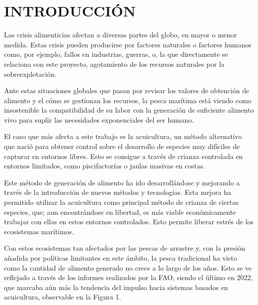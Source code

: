 \section{INTRODUCCIÓN}

Las crisis alimenticias afectan a diversas partes del globo, en mayor o menor medida. Estas crisis pueden producirse por factores naturales o factores humanos como, por ejemplo, fallos en industrias, guerras, o, la que directamente se relaciona con este proyecto, agotamiento de los recursos naturales por la sobreexplotación.

Ante estas situaciones globales que pasan por revisar los valores de obtención de alimento y el cómo se gestionan los recursos, la pesca marítima está viendo como insostenible la compatibilidad de su labor con la generación de suficiente alimento vivo para suplir las necesidades exponenciales del ser humano.

El caso que más afecta a este trabajo es la acuicultura, un método alternativo que nació para obtener control sobre el desarrollo de especies muy difíciles de capturar en entornos libres. Esto se consigue a través de crianza controlada en entornos limitados, como piscifactorías o jaulas masivas en costas.

Este método de generación de alimento ha ido desarrollándose y mejorando a través de la introducción de nuevos métodos y tecnologías. Esta mejora ha permitido utilizar la acuicultura como principal método de crianza de ciertas especies, que; aun encontrándose en libertad, es más viable económicamente trabajar con ellas en estos entornos controlados. Esto permite liberar estrés de los ecosistemas marítimos.

Con estos ecosistemas tan afectados por las pescas de arrastre y, con la presión añadida por políticas limitantes en este ámbito, la pesca tradicional ha visto como la cantidad de alimento generado no crece a lo largo de los años. Esto se ve reflejado a través de los informes realizados por la FAO, siendo el último en 2022, que marcaba aún más la tendencia del impulso hacia sistemas basados en acuicultura, observable en la Figura 1.
